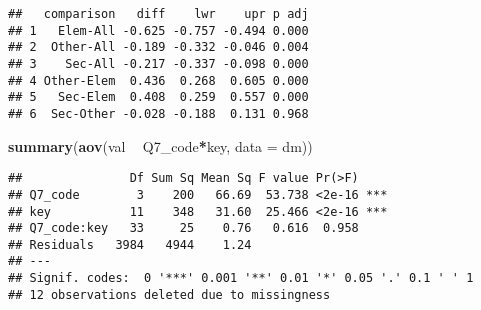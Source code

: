 \documentclass[]{article}
\newenvironment{Shaded}{\begin{snugshade}}{\end{snugshade}}
\newcommand{\KeywordTok}[1]{\textcolor[rgb]{0.13,0.29,0.53}{\textbf{#1}}}
\newcommand{\DataTypeTok}[1]{\textcolor[rgb]{0.13,0.29,0.53}{#1}}
\newcommand{\StringTok}[1]{\textcolor[rgb]{0.31,0.60,0.02}{#1}}
\newcommand{\OperatorTok}[1]{\textcolor[rgb]{0.81,0.36,0.00}{\textbf{#1}}}
\newcommand{\NormalTok}[1]{#1}
\begin{document}
\begin{verbatim}
##   comparison   diff    lwr    upr p adj
## 1   Elem-All -0.625 -0.757 -0.494 0.000
## 2  Other-All -0.189 -0.332 -0.046 0.004
## 3    Sec-All -0.217 -0.337 -0.098 0.000
## 4 Other-Elem  0.436  0.268  0.605 0.000
## 5   Sec-Elem  0.408  0.259  0.557 0.000
## 6  Sec-Other -0.028 -0.188  0.131 0.968
\end{verbatim}

\begin{Shaded}
\begin{Highlighting}[]
\KeywordTok{summary}\NormalTok{(}\KeywordTok{aov}\NormalTok{(val }\OperatorTok{~}\StringTok{ }\NormalTok{Q7_code}\OperatorTok{*}\NormalTok{key, }\DataTypeTok{data =}\NormalTok{ dm))}
\end{Highlighting}
\end{Shaded}

\begin{verbatim}
##               Df Sum Sq Mean Sq F value Pr(>F)    
## Q7_code        3    200   66.69  53.738 <2e-16 ***
## key           11    348   31.60  25.466 <2e-16 ***
## Q7_code:key   33     25    0.76   0.616  0.958    
## Residuals   3984   4944    1.24                   
## ---
## Signif. codes:  0 '***' 0.001 '**' 0.01 '*' 0.05 '.' 0.1 ' ' 1
## 12 observations deleted due to missingness
\end{verbatim}
\end{document}
